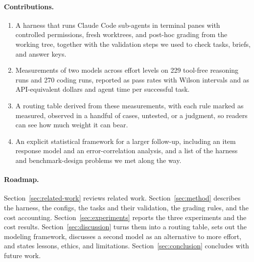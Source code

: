 \paragraph{Contributions.}
\begin{enumerate}[leftmargin=*]
  \item A harness that runs Claude Code sub-agents in terminal panes with controlled permissions, fresh worktrees, and post-hoc grading from the working tree, together with the validation steps we used to check tasks, briefs, and answer keys.
  \item Measurements of two models across effort levels on 229 tool-free reasoning runs and 270 coding runs, reported as pass rates with Wilson intervals and as API-equivalent dollars and agent time per successful task.
  \item A routing table derived from these measurements, with each rule marked as measured, observed in a handful of cases, untested, or a judgment, so readers can see how much weight it can bear.
  \item An explicit statistical framework for a larger follow-up, including an item response model and an error-correlation analysis, and a list of the harness and benchmark-design problems we met along the way.
\end{enumerate}

\paragraph{Roadmap.}
Section~\ref{sec:related-work} reviews related work. Section~\ref{sec:method} describes the harness, the configs, the tasks and their validation, the grading rules, and the cost accounting. Section~\ref{sec:experiments} reports the three experiments and the cost results. Section~\ref{sec:discussion} turns them into a routing table, sets out the modeling framework, discusses a second model as an alternative to more effort, and states lessons, ethics, and limitations. Section~\ref{sec:conclusion} concludes with future work.
